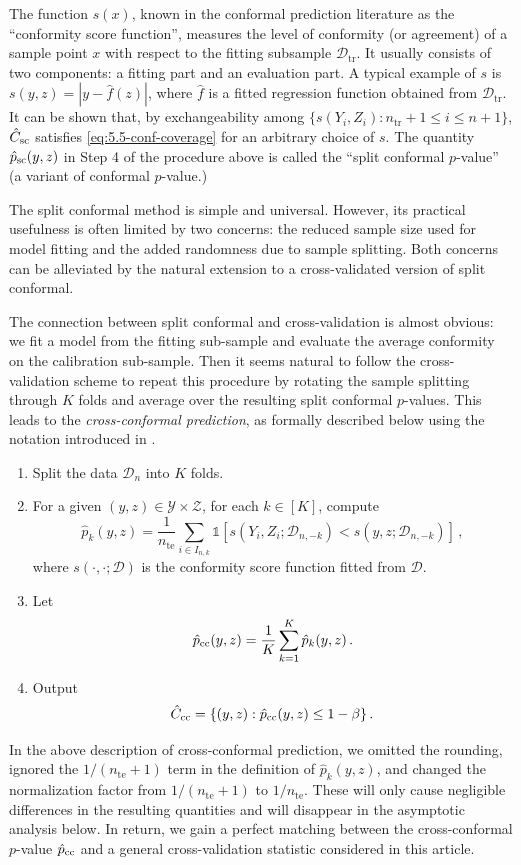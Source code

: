 \documentclass[11pt]{article}
\theoremstyle{plain}
\newcommand{\tr}{{\mathrm{tr}}}
\newcommand{\te}{{\mathrm{te}}}
\newcommand{\D}{{\mathcal{D}}}
\begin{document}
The function $s(x)$, known in the conformal prediction literature as the ``conformity score function'', measures the level of conformity (or agreement) of a sample point $x$ with respect to the fitting subsample $\D_\tr$.  It usually consists of two components: a fitting part and an evaluation part.  A typical example of $s$ is 
$s(y,z)=|y-\hat f(z)|$, where $\hat f$ is a fitted regression function obtained from $\D_\tr$. It can be shown that, by exchangeability among $\{s(Y_i,Z_i):n_\tr+1\le i\le n+1\}$, $\hat C_{\rm sc}$ satisfies \eqref{eq:5.5-conf-coverage} for an arbitrary choice of $s$.  The quantity $\hat p_{\rm sc}(y,z)$ in Step 4 of the procedure above is called the ``split conformal $p$-value'' (a variant of conformal $p$-value.)

The split conformal method is simple and universal.  However, its practical usefulness is often limited by two concerns: the reduced sample size used for model fitting and the added randomness due to sample splitting. Both concerns can be alleviated by the natural extension to a cross-validated version of split conformal.

The connection between split conformal and cross-validation is almost obvious: we fit a model from the fitting sub-sample and evaluate the average conformity on the calibration sub-sample.  Then it seems natural to follow the cross-validation scheme to repeat this procedure by rotating the sample splitting through $K$ folds and average over the resulting split conformal $p$-values.  This leads to the \emph{cross-conformal prediction}, as formally described below using the notation introduced in .
\begin{enumerate}
    \item Split the data $\D_n$ into $K$ folds.
    \item For a given $(y,z)\in\mathcal Y\times\mathcal Z$, for each $k\in[K]$,
    compute
    $$\hat p_{k}(y,z)=\frac{1}{n_\te}\sum_{i\in I_{n,k}}\mathds{1}[s(Y_i,Z_i;\D_{n,-k})<s(y,z;\D_{n,-k})]\,,$$
    where $s(\cdot,\cdot;\D)$ is the conformity score function fitted from $\D$.
    \item Let 
    $$
    \hat p_{\rm{cc}}(y,z)=\frac{1}{K}\sum_{k=1}^K\hat p_{k}(y,z)\,.
    $$
    \item Output
    $$\hat C_{{\rm cc}} = \{(y,z):\hat p_{\rm cc}(y,z)\le 1-\beta\}\,.
    $$
\end{enumerate}
In the above description of cross-conformal prediction, we omitted the rounding, ignored the $1/(n_\te+1)$ term in the definition of $\hat p_k(y,z)$, and changed the normalization factor from $1/(n_\te+1)$ to $1/n_\te$. These will only cause negligible differences in the resulting quantities and will disappear in the asymptotic analysis below.  In return, we gain a perfect matching between the cross-conformal $p$-value $\hat p_{\rm cc}$ and a general cross-validation statistic considered in this article.
\end{document}
